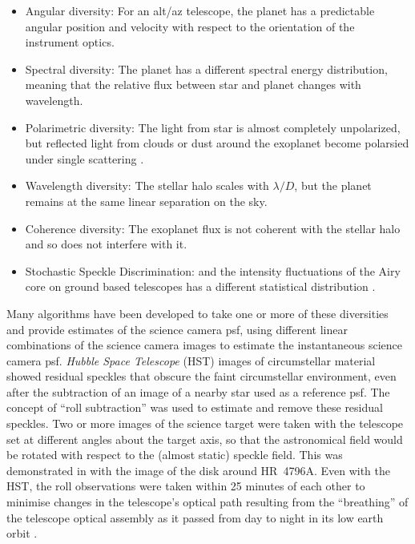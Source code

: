 \documentclass[letterpaper]{ar-1col}
\newcommand{\ld}{$\lambda/D$}
\begin{document}
\begin{itemize}
    \item Angular diversity: For an alt/az telescope, the planet has a predictable angular position and velocity with respect to the orientation of the instrument optics.
    \item Spectral diversity: The planet has a different spectral energy distribution, meaning that the relative flux between star and planet changes with wavelength.
    \item Polarimetric diversity: The light from star is almost completely unpolarized, but reflected light from clouds or dust around the exoplanet become polarsied under single scattering \citep{Gledhill91}.
    \item Wavelength diversity: The stellar halo scales with \ld{}, but the planet remains at the same linear separation on the sky.
    \item Coherence diversity: The exoplanet flux is not coherent with the stellar halo and so does not interfere with it.
    \item Stochastic Speckle Discrimination: and the intensity fluctuations of the Airy core on ground based telescopes has a different statistical distribution \citep{Gladysz09}.
\end{itemize}

Many algorithms have been developed to take one or more of these diversities and provide estimates of the science camera \ac{psf}, using different linear combinations of the science camera images to estimate the instantaneous science camera \ac{psf}.
%
{\it Hubble Space Telescope} (HST) images of circumstellar material showed residual speckles that obscure the faint circumstellar environment, even after the subtraction of an image of a nearby star used as a reference \ac{psf}.
%
The concept of ``roll subtraction''  \citep{Schneider98} was used to estimate and remove these residual speckles.
%
Two or more images of the science target were taken with the telescope set at different angles about the target axis, so that the astronomical field would be rotated with respect to the (almost static) speckle field.
%
This was demonstrated in \citet{Schneider99} with the image of the disk around HR~4796A.
%
Even with the HST, the roll observations were taken within 25 minutes of each other to minimise changes in the telescope's optical path resulting from the ``breathing'' of the telescope optical assembly as it passed from day to night in its low earth orbit \citep{Bely93}.
\end{document}
